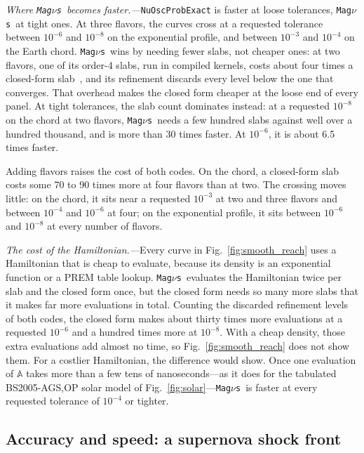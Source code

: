 \documentclass[final,5p,times,twocolumn,sort,compress]{elsarticle}
\makeatletter
\newcommand{\fig}{Fig.}
\DeclareRobustCommand{\_}{%
  \ifmmode\nfss@text{\textunderscore}\else\textunderscore\allowbreak\fi}
\newcommand{\figu}[1]{\fig~\ref{fig:#1}}
\newcommand{\magnus}{{\tt Mag}\ensuremath{\nu}{\tt s}}
\makeatother
\begin{document}
\smallskip

\textit{Where \magnus\ becomes faster.---}{\tt NuOscProbExact} is faster at loose tolerances, \magnus\ at tight ones. At three flavors, the curves cross at a requested tolerance between $10^{-6}$ and $10^{-8}$ on the exponential profile, and between $10^{-3}$ and $10^{-4}$ on the Earth chord. \magnus\ wins by needing fewer slabs, not cheaper ones: at two flavors, one of its order-4 slabs, run in compiled kernels, costs about four times a closed-form slab~\cite{Bustamante:2019ggq}, and its refinement discards every level below the one that converges. That overhead makes the closed form cheaper at the loose end of every panel. At tight tolerances, the slab count dominates instead: at a requested $10^{-8}$ on the chord at two flavors, \magnus\ needs a few hundred slabs against well over a hundred thousand, and is more than 30 times faster. At $10^{-6}$, it is about 6.5 times faster.

Adding flavors raises the cost of both codes. On the chord, a closed-form slab costs some 70 to 90 times more at four flavors than at two. The crossing moves little: on the chord, it sits near a requested $10^{-3}$ at two and three flavors and between $10^{-4}$ and $10^{-6}$ at four; on the exponential profile, it sits between $10^{-6}$ and $10^{-8}$ at every number of flavors.

\smallskip

\textit{The cost of the Hamiltonian.---}Every curve in \figu{smooth_reach} uses a Hamiltonian that is cheap to evaluate, because its density is an exponential function or a PREM table lookup. \magnus\ evaluates the Hamiltonian twice per slab and the closed form once, but the closed form needs so many more slabs that it makes far more evaluations in total. Counting the discarded refinement levels of both codes, the closed form makes about thirty times more evaluations at a requested $10^{-6}$ and a hundred times more at $10^{-8}$. With a cheap density, those extra evaluations add almost no time, so \figu{smooth_reach} does not show them. For a costlier Hamiltonian, the difference would show. Once one evaluation of $\mathbb{A}$ takes more than a few tens of nanoseconds---as it does for the tabulated BS2005-AGS,OP solar model of \figu{solar}---\magnus\ is faster at every requested tolerance of $10^{-4}$ or tighter.


\subsection{Accuracy and speed: a supernova shock front}
\label{sec:shock_comparison}
\end{document}
